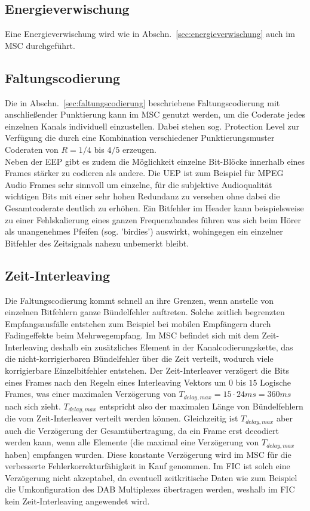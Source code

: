 \subsection{Energieverwischung}
Eine Energieverwischung wird wie in Abschn.~\ref{sec:energieverwischung} auch im \ac{MSC} durchgeführt.

\subsection{Faltungscodierung}
Die in Abschn.~\ref{sec:faltungscodierung} beschriebene Faltungscodierung mit anschließender Punktierung kann im \ac{MSC} genutzt werden, um die Coderate jedes einzelnen Kanals individuell einzustellen. Dabei stehen sog. Protection Level zur Verfügung die durch eine Kombination verschiedener Punktierungsmuster Coderaten von $R=1/4$ bis $4/5$ erzeugen.\\
Neben der \ac{EEP} gibt es zudem die Möglichkeit einzelne Bit-Blöcke innerhalb eines Frames stärker zu codieren als andere. Die \ac{UEP} ist zum Beispiel für MPEG Audio Frames sehr sinnvoll um einzelne, für die subjektive Audioqualität wichtigen Bits mit einer sehr hohen Redundanz zu versehen ohne dabei die Gesamtcoderate deutlich zu erhöhen. Ein Bitfehler im Header kann beispielsweise zu einer Fehlskalierung eines ganzen Frequenzbandes führen was sich beim Hörer als unangenehmes Pfeifen (sog. 'birdies') auswirkt, wohingegen ein einzelner Bitfehler des Zeitsignals nahezu unbemerkt bleibt.

\subsection{Zeit-Interleaving}
\label{sec:time_interleaving_std}
Die Faltungscodierung kommt schnell an ihre Grenzen, wenn anstelle von einzelnen Bitfehlern ganze Bündelfehler auftreten. Solche zeitlich begrenzten Empfangsausfälle entstehen zum Beispiel bei mobilen Empfängern durch Fadingeffekte beim Mehrwegempfang. Im \ac{MSC} befindet sich mit dem Zeit-Interleaving deshalb ein zusätzliches Element in der Kanalcodierungskette, das die nicht-korrigierbaren Bündelfehler über die Zeit verteilt, wodurch viele korrigierbare Einzelbitfehler entstehen. Der Zeit-Interleaver verzögert die Bits eines Frames nach den Regeln eines Interleaving Vektors um $0$ bis $15$ Logische Frames, was einer maximalen Verzögerung von $T_{delay, max} = 15 \cdot 24ms = 360 ms$ nach sich zieht. $T_{delay, max}$ entspricht also der maximalen Länge von Bündelfehlern die vom Zeit-Interleaver verteilt werden können. Gleichzeitig ist $T_{delay, max}$ aber auch die Verzögerung der Gesamtübertragung, da ein Frame erst decodiert werden kann, wenn alle Elemente (die maximal eine Verzögerung von $T_{delay, max}$ haben) empfangen wurden. Diese konstante Verzögerung wird im MSC für die verbesserte Fehlerkorrekturfähigkeit in Kauf genommen. Im FIC ist solch eine Verzögerung nicht akzeptabel, da eventuell zeitkritische Daten wie zum Beispiel die Umkonfiguration des DAB Multiplexes übertragen werden, weshalb im FIC kein Zeit-Interleaving angewendet wird.

